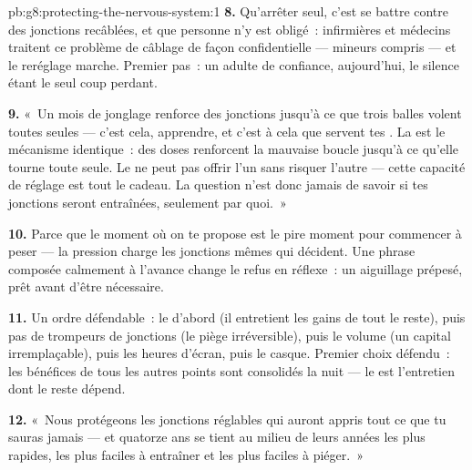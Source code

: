 \begin{solution}{pb:g8:protecting-the-nervous-system:1}
\textbf{8.} Qu'arrêter seul, c'est se battre contre des
jonctions recâblées, et que personne n'y est obligé~:
infirmières et médecins traitent ce problème de câblage de
façon confidentielle --- mineurs compris --- et le
reréglage marche. Premier pas~: un adulte de confiance,
aujourd'hui, le silence étant le seul coup perdant.

\textbf{9.} «~Un mois de jonglage renforce des jonctions
jusqu'à ce que trois balles volent toutes seules --- c'est
cela, apprendre, et c'est à cela que servent tes .
La  est le mécanisme identique~: des doses
renforcent la mauvaise boucle jusqu'à ce qu'elle tourne
toute seule. Le  ne peut pas offrir l'un sans
risquer l'autre --- cette capacité de réglage est tout le
cadeau. La question n'est donc jamais de savoir si tes
jonctions seront entraînées, seulement par quoi.~»

\textbf{10.} Parce que le moment où on te propose est le
pire moment pour commencer à peser --- la pression charge
les jonctions mêmes qui décident. Une phrase composée
calmement à l'avance change le refus en réflexe~: un
aiguillage prépesé, prêt avant d'être nécessaire.

\textbf{11.} Un ordre défendable~: le  d'abord (il
entretient les gains de tout le reste), puis pas de
trompeurs de jonctions (le piège irréversible), puis le
volume (un capital irremplaçable), puis les heures
d'écran, puis le casque. Premier choix défendu~: les
bénéfices de tous les autres points sont consolidés la
nuit --- le  est l'entretien dont le reste dépend.

\textbf{12.} «~Nous protégeons les jonctions réglables qui
auront appris tout ce que tu sauras jamais --- et quatorze
ans se tient au milieu de leurs années les plus rapides,
les plus faciles à entraîner et les plus faciles à
piéger.~»
\end{solution}

